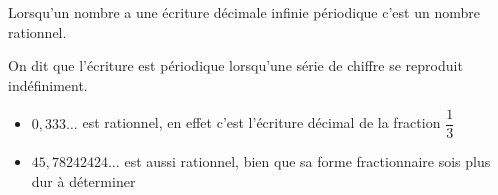 \begin{prop}{}{}
Lorsqu'un nombre a une écriture décimale infinie périodique c'est un nombre rationnel.
\end{prop}

\begin{rem}{}{}
On dit que l'écriture est périodique lorsqu'une série de chiffre se reproduit indéfiniment.
\end{rem}

\begin{ex}{}{}
\begin{itemize}
	\item  $0,333\dots$ est rationnel, en effet c'est l'écriture décimal de la fraction $\dfrac{1}{3}$
	\item  $45,78242424\dots$ est aussi rationnel, bien que sa forme fractionnaire sois plus dur à déterminer
\end{itemize}
\end{ex}